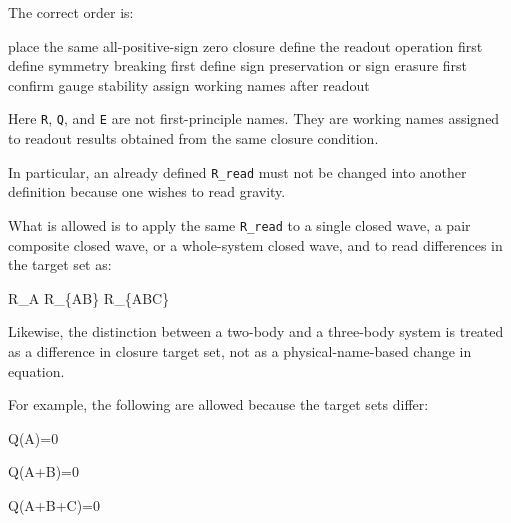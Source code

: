 \documentclass[
  a4paper]{article}
\newenvironment{Shaded}{}{}
\newcommand{\NormalTok}[1]{#1}
\begin{document}
The correct order is:

\begin{Shaded}
\begin{Highlighting}[]
\NormalTok{place the same all{-}positive{-}sign zero closure}
\NormalTok{define the readout operation first}
\NormalTok{define symmetry breaking first}
\NormalTok{define sign preservation or sign erasure first}
\NormalTok{confirm gauge stability}
\NormalTok{assign working names after readout}
\end{Highlighting}
\end{Shaded}

Here \texttt{R}, \texttt{Q}, and \texttt{E} are not first-principle
names. They are working names assigned to readout results obtained from
the same closure condition.

In particular, an already defined \texttt{R\_read} must not be changed
into another definition because one wishes to read gravity.

What is allowed is to apply the same \texttt{R\_read} to a single closed
wave, a pair composite closed wave, or a whole-system closed wave, and
to read differences in the target set as:

\begin{Shaded}
\begin{Highlighting}[]
\NormalTok{R\_A}
\NormalTok{R\_\{AB\}}
\NormalTok{R\_\{ABC\}}
\end{Highlighting}
\end{Shaded}

Likewise, the distinction between a two-body and a three-body system is
treated as a difference in closure target set, not as a
physical-name-based change in equation.

For example, the following are allowed because the target sets differ:

\begin{Shaded}
\begin{Highlighting}[]
\NormalTok{Q(A)=0}
\end{Highlighting}
\end{Shaded}

\begin{Shaded}
\begin{Highlighting}[]
\NormalTok{Q(A+B)=0}
\end{Highlighting}
\end{Shaded}

\begin{Shaded}
\begin{Highlighting}[]
\NormalTok{Q(A+B+C)=0}
\end{Highlighting}
\end{Shaded}
\end{document}
